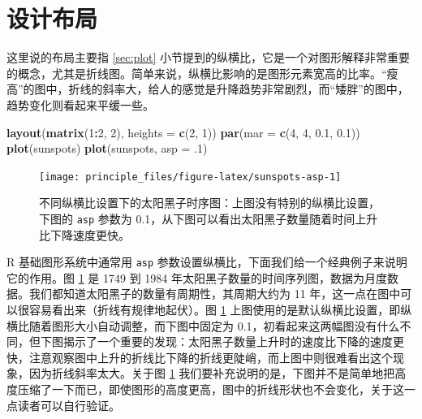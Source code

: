 \documentclass[
  b5paper,
  UTF8,twoside]{book}
\newenvironment{Shaded}{\begin{snugshade}}{\end{snugshade}}
\newcommand{\AttributeTok}[1]{\textcolor[rgb]{0.13,0.29,0.53}{#1}}
\newcommand{\DecValTok}[1]{\textcolor[rgb]{0.00,0.00,0.81}{#1}}
\newcommand{\FloatTok}[1]{\textcolor[rgb]{0.00,0.00,0.81}{#1}}
\newcommand{\FunctionTok}[1]{\textcolor[rgb]{0.13,0.29,0.53}{\textbf{#1}}}
\newcommand{\NormalTok}[1]{#1}
\newcommand{\SpecialCharTok}[1]{\textcolor[rgb]{0.81,0.36,0.00}{\textbf{#1}}}
\begin{document}
\section{设计布局}\label{ux8bbeux8ba1ux5e03ux5c40}

这里说的布局主要指 \ref{sec:plot} 小节提到的纵横比，它是一个对图形解释非常重要的概念，尤其是折线图。简单来说，纵横比影响的是图形元素宽高的比率。``瘦高''的图中，折线的斜率大，给人的感觉是升降趋势非常剧烈，而``矮胖''的图中，趋势变化则看起来平缓一些。

\begin{Shaded}
\begin{Highlighting}[]
\FunctionTok{layout}\NormalTok{(}\FunctionTok{matrix}\NormalTok{(}\DecValTok{1}\SpecialCharTok{:}\DecValTok{2}\NormalTok{, }\DecValTok{2}\NormalTok{), }\AttributeTok{heights =} \FunctionTok{c}\NormalTok{(}\DecValTok{2}\NormalTok{, }\DecValTok{1}\NormalTok{))}
\FunctionTok{par}\NormalTok{(}\AttributeTok{mar =} \FunctionTok{c}\NormalTok{(}\DecValTok{4}\NormalTok{, }\DecValTok{4}\NormalTok{, }\FloatTok{0.1}\NormalTok{, }\FloatTok{0.1}\NormalTok{))}
\FunctionTok{plot}\NormalTok{(sunspots)}
\FunctionTok{plot}\NormalTok{(sunspots, }\AttributeTok{asp =}\NormalTok{ .}\DecValTok{1}\NormalTok{)}
\end{Highlighting}
\end{Shaded}

\begin{figure}

{\centering \texttt{[image: principle\_files/figure-latex/sunspots-asp-1]} 

}

\caption[不同纵横比设置下的太阳黑子时序图]{不同纵横比设置下的太阳黑子时序图：上图没有特别的纵横比设置，下图的 \texttt{asp} 参数为 0.1，从下图可以看出太阳黑子数量随着时间上升比下降速度更快。}\label{fig:sunspots-asp}
\end{figure}



R 基础图形系统中通常用 \texttt{asp} 参数设置纵横比，下面我们给一个经典例子来说明它的作用。图 \ref{fig:sunspots-asp} 是 1749 到 1984 年太阳黑子数量的时间序列图，数据为月度数据。我们都知道太阳黑子的数量有周期性，其周期大约为 11 年，这一点在图中可以很容易看出来（折线有规律地起伏）。图 \ref{fig:sunspots-asp} 上图使用的是默认纵横比设置，即纵横比随着图形大小自动调整，而下图中固定为 0.1，初看起来这两幅图没有什么不同，但下图揭示了一个重要的发现：太阳黑子数量上升时的速度比下降的速度更快，注意观察图中上升的折线比下降的折线更陡峭，而上图中则很难看出这个现象，因为折线斜率太大。关于图 \ref{fig:sunspots-asp} 我们要补充说明的是，下图并不是简单地把高度压缩了一下而已，即使图形的高度更高，图中的折线形状也不会变化，关于这一点读者可以自行验证。
\end{document}
